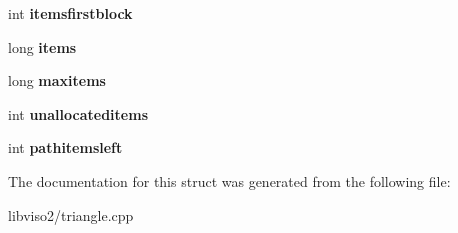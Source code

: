 \begin{DoxyCompactItemize}
\item 
\hypertarget{structmemorypool_aea58af830e899435d7f9547fd8920c3f}{int {\bfseries itemsfirstblock}}\label{structmemorypool_aea58af830e899435d7f9547fd8920c3f}

\item 
\hypertarget{structmemorypool_a9a59491a2dbbb46ae00b494a2652404f}{long {\bfseries items}}\label{structmemorypool_a9a59491a2dbbb46ae00b494a2652404f}

\item 
\hypertarget{structmemorypool_a851a3bc61c20c58ba0da9b8e45e7ab3d}{long {\bfseries maxitems}}\label{structmemorypool_a851a3bc61c20c58ba0da9b8e45e7ab3d}

\item 
\hypertarget{structmemorypool_ae407db4294305e97b4072f6117f2bfa9}{int {\bfseries unallocateditems}}\label{structmemorypool_ae407db4294305e97b4072f6117f2bfa9}

\item 
\hypertarget{structmemorypool_a34c47ac30b534652a93e9d3f742648ff}{int {\bfseries pathitemsleft}}\label{structmemorypool_a34c47ac30b534652a93e9d3f742648ff}

\end{DoxyCompactItemize}


The documentation for this struct was generated from the following file\+:\begin{DoxyCompactItemize}
\item 
libviso2/triangle.\+cpp\end{DoxyCompactItemize}
